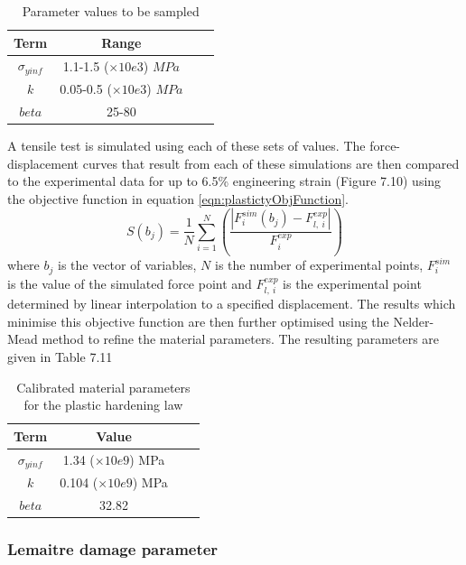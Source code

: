 \documentclass[sn-mathphys,Numbered,draft]{sn-jnl}%
\begin{document}
\begin{table}[htb]
	\centering
		\begin{tabular}{cccc} \hline
			Term  & Range  \\ \hline 
             $\sigma_{yinf}$ & 1.1-1.5 ($\times10e3$) $MPa$ \\
			$k$ & 0.05-0.5 ($\times10e3$) $MPa$  \\
   		$beta$ & 25-80 &  \\
			\hline
		\end{tabular}
	\caption{Parameter values to be sampled}
	\label{tab:material_properties}
\end{table}

A tensile test is simulated using each of these sets of values. The force-displacement curves that result from each of these simulations are then compared to the experimental data for up to 6.5\% engineering strain (Figure 7.10) using the objective function in equation \ref{eqn:plastictyObjFunction}. 
\begin{equation}
\label{eqn:plastictyObjFunction}
S(b_j)=\frac{1}{N} \sum_{i=1}^N\left(\frac{|F^{sim}_i(b_j)-F^{exp}_{l,\ i}|}{F^{exp}_i}\right)
\end{equation}
where $b_j$ is the vector of variables, $N$ is the number of experimental points, $F^{sim}_i$ is the value of the simulated force point and $F^{exp}_{l,\ i}$ is the experimental point determined by linear interpolation to a specified displacement.
The results which minimise this objective function are then further optimised using the Nelder-Mead method \cite{luersen_globalized_2004} to refine the material parameters. 
 The resulting parameters are given in Table 7.11
 
\begin{table}[htb]
	\centering
		\begin{tabular}{cccc} \hline
			Term  & Value  \\ \hline 
            $\sigma_{yinf}$ & 1.34 ($\times10e9$) MPa \\
			$k$ & 0.104 ($\times10e9$) MPa  \\
   		$beta$ & 32.82 &  \\
			\hline
		\end{tabular}
	\caption{Calibrated material parameters for the plastic hardening law}
	\label{tab:material_properties}
\end{table}

\subsubsection{Lemaitre damage parameter}
\end{document}
